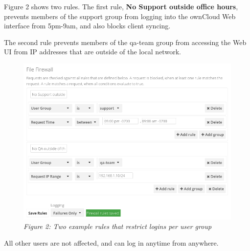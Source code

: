 \documentclass[letterpaper,10pt,english]{sphinxmanual}
\begin{document}
Figure 2 shows two rules. The first rule, \textbf{No Support outside
office hours}, prevents members of the support group from logging into the
ownCloud Web interface from 5pm-9am, and also blocks client syncing.

The second rule prevents members of the qa-team group from accessing the Web UI
from IP addresses that are outside of the local network.
\begin{figure}[htbp]
\centering
\capstart

\includegraphics{firewall-2.png}
\caption{\emph{Figure 2: Two example rules that restrict logins per user group}}\end{figure}

All other users are not affected, and can log in anytime from anywhere.
\end{document}
